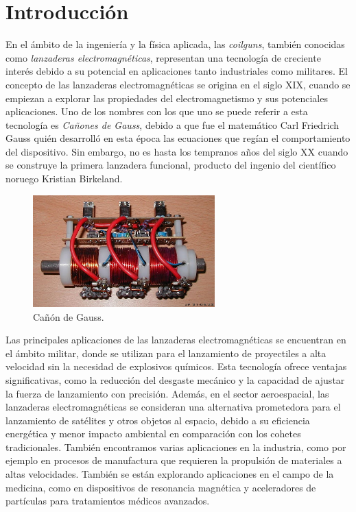 \section{Introducción}
\label{sec:introduccion}

En el ámbito de la ingeniería y la física aplicada, las \textit{coilguns}, también conocidas como \textit{lanzaderas electromagnéticas}, representan una tecnología de creciente interés debido a su potencial en aplicaciones tanto industriales como militares. El concepto de las lanzaderas electromagnéticas se origina en el siglo XIX, cuando se empiezan a explorar las propiedades del electromagnetismo y sus potenciales aplicaciones. Uno de los nombres con los que uno se puede referir a esta tecnología es \textit{Cañones de Gauss}, debido a que fue el matemático Carl Friedrich Gauss quién desarrolló en esta época las ecuaciones que regían el comportamiento del dispositivo. Sin embargo, no es hasta los tempranos años del siglo XX cuando se construye la primera lanzadera funcional, producto del ingenio del científico noruego Kristian Birkeland\citep{introCoilGun}.

\begin{figure}[h]
    \centering
    \includegraphics[width=7cm]{FigurasMemoria/fig1coilgunIntro.jpeg}
    \caption{Cañón de Gauss\citep{coilgun2024}.}
    \label{fig:prototipolanzadera} %
\end{figure}

Las principales aplicaciones de las lanzaderas electromagnéticas se encuentran en el ámbito militar\citep{inproceedings}, donde se utilizan para el lanzamiento de proyectiles a alta velocidad sin la necesidad de explosivos químicos. Esta tecnología ofrece ventajas significativas, como la reducción del desgaste mecánico y la capacidad de ajustar la fuerza de lanzamiento con precisión. Además, en el sector aeroespacial\citep{inproceedings}, las lanzaderas electromagnéticas se consideran una alternativa prometedora para el lanzamiento de satélites y otros objetos al espacio, debido a su eficiencia energética y menor impacto ambiental en comparación con los cohetes tradicionales. También encontramos varias aplicaciones en la industria, como por ejemplo en procesos de manufactura que requieren la propulsión de materiales a altas velocidades. También se están explorando aplicaciones en el campo de la medicina, como en dispositivos de resonancia magnética y aceleradores de partículas para tratamientos médicos avanzados\citep{inproceedings}.

